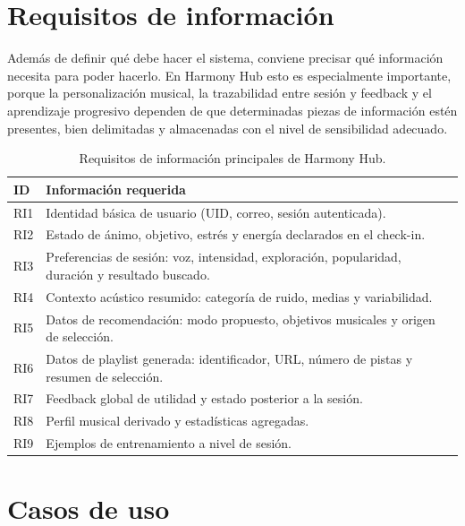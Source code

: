 \section{Requisitos de información}
\label{sec:requisitos_informacion}

Además de definir qué debe hacer el sistema, conviene precisar qué información
necesita para poder hacerlo. En Harmony Hub esto es especialmente importante,
porque la personalización musical, la trazabilidad entre sesión y feedback y el
aprendizaje progresivo dependen de que determinadas piezas de información estén
presentes, bien delimitadas y almacenadas con el nivel de sensibilidad
adecuado.

\begin{table}[H]
\centering
\footnotesize
\renewcommand{\arraystretch}{1.1}
\setlength{\tabcolsep}{3.5pt}
\begin{tabularx}{\textwidth}{|P{1.1cm}|Y|}
\hline
\textbf{ID} & \textbf{Información requerida} \\
\hline
RI1 & Identidad básica de usuario (UID, correo, sesión autenticada). \\
\hline
RI2 & Estado de ánimo, objetivo, estrés y energía declarados en el check-in. \\
\hline
RI3 & Preferencias de sesión: voz, intensidad, exploración, popularidad, duración y resultado buscado. \\
\hline
RI4 & Contexto acústico resumido: categoría de ruido, medias y variabilidad. \\
\hline
RI5 & Datos de recomendación: modo propuesto, objetivos musicales y origen de selección. \\
\hline
RI6 & Datos de playlist generada: identificador, URL, número de pistas y resumen de selección. \\
\hline
RI7 & Feedback global de utilidad y estado posterior a la sesión. \\
\hline
RI8 & Perfil musical derivado y estadísticas agregadas. \\
\hline
RI9 & Ejemplos de entrenamiento a nivel de sesión. \\
\hline
\end{tabularx}
\caption{Requisitos de información principales de Harmony Hub.}
\label{tab:requisitos_informacion}
\end{table}

\section{Casos de uso}
\label{sec:casos_uso}

